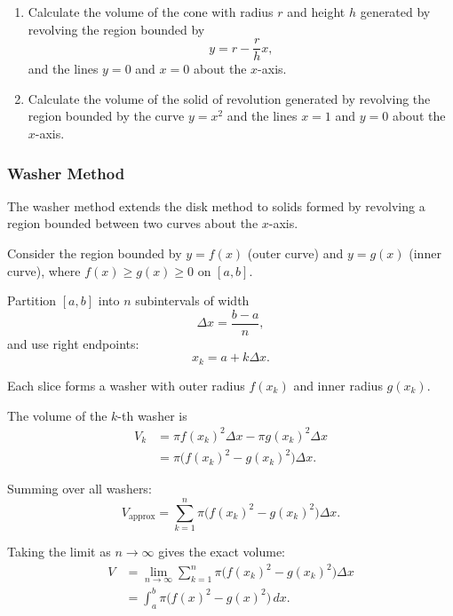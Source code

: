 \begin{enumerate}
\item Calculate the volume of the cone with radius $r$ and height $h$ 
generated by revolving the region bounded by
\[
y = r - \frac{r}{h}x,
\]
and the lines $y=0$ and $x=0$ about the $x$-axis.

\item Calculate the volume of the solid of revolution generated by 
revolving the region bounded by the curve $y = x^2$ and the lines 
$x=1$ and $y=0$ about the $x$-axis.
\end{enumerate}

\subsubsection{Washer Method}
\label{sss:wash-235c}

The washer method extends the disk method to solids formed by revolving 
a region bounded between two curves about the $x$-axis.

\medskip

Consider the region bounded by $y = f(x)$ (outer curve) and 
$y = g(x)$ (inner curve), where $f(x) \ge g(x) \ge 0$ on $[a,b]$.

\medskip

Partition $[a,b]$ into $n$ subintervals of width
\[
\Delta x = \frac{b-a}{n},
\]
and use right endpoints:
\[
x_k = a + k\Delta x.
\]

Each slice forms a washer with outer radius $f(x_k)$ and inner radius $g(x_k)$.

The volume of the $k$-th washer is
\begin{align}
V_k 
&= \pi f(x_k)^2 \Delta x - \pi g(x_k)^2 \Delta x \\
&= \pi\bigl(f(x_k)^2 - g(x_k)^2\bigr)\Delta x.
\end{align}

Summing over all washers:
\[
V_{\text{approx}} = \sum_{k=1}^{n} \pi\bigl(f(x_k)^2 - g(x_k)^2\bigr)\Delta x.
\]

Taking the limit as $n \to \infty$ gives the exact volume:
\begin{align}
V 
&= \lim_{n\to\infty} \sum_{k=1}^{n} \pi\bigl(f(x_k)^2 - g(x_k)^2\bigr)\Delta x \\
&= \int_a^b \pi\bigl(f(x)^2 - g(x)^2\bigr)\,dx.
\end{align}

